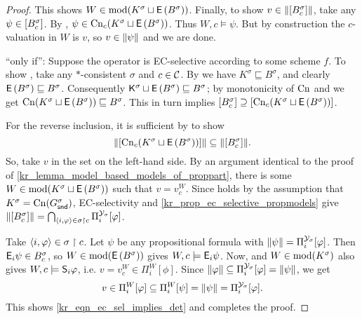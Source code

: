 \begin{proof}
    This shows $W \in \mods(K^\sigma \sqcup \exppart{B^\sigma})$. Finally, to
    show $v \in \propmods{\proppart{B^\sigma_c}}$, take any $\psi \in
    \proppart{B^\sigma_c}$. By \determination{}, $\psi \in \cn_c(K^\sigma
    \sqcup \exppart{B^\sigma})$. Thus $W, c \models \psi$. But by construction
    the $c$-valuation in $W$ is $v$, so $v \in \propmods{\psi}$ and we are
    done.

    ``only if'': Suppose the operator is EC-selective according to some scheme
    $f$. To show \determination{}, take any $\ast$-consistent $\sigma$ and $c
    \in \C$. By \containment{} we have $K^\sigma \sqsubseteq B^\sigma$, and
    clearly $\exppart{B^\sigma} \sqsubseteq B^\sigma$. Consequently $\K^\sigma
    \sqcup \exppart{B^\sigma} \sqsubseteq B^\sigma$; by monotonicity of $\cn$
    and \closure{} we get $\cn(K^\sigma \sqcup \exppart{B^\sigma}) \sqsubseteq
    B^\sigma$. This in turn implies $\proppart{B^\sigma_c} \supseteq
    \proppart{\cn_c(K^\sigma \sqcup \exppart{B^\sigma})}$.

    For the reverse inclusion, it is sufficient by \closure{} to show
    \begin{equation}
        \label{kr_eqn_ec_sel_implies_det}
        \propmods{\proppart{\cn_c(K^\sigma \sqcup \exppart{B^\sigma})}}
        \subseteq
        \propmods{\proppart{B^\sigma_c}}.
    \end{equation}
    So, take $v$ in the set on the left-hand side. By an argument identical to
    the proof of \cref{kr_lemma_model_based_models_of_proppart}, there is some
    $W \in \mods(K^\sigma \sqcup \exppart{B^\sigma})$ such that $v = v^W_c$.
    Since \soundness{} holds by the assumption that $K^\sigma =
    \cn(G^\sigma_\snd)$, EC-selectivity and
    \cref{kr_prop_ec_selective_propmodels} give
    $\propmods{\proppart{B^\sigma_c}} = \bigcap_{\tuple{i, \phi} \in \sigma \rs
    c}{ \Pi^{\Y_\sigma}_i[\phi] }$.

    Take $\tuple{i, \phi} \in \sigma \rs c$. Let $\psi$ be any propositional
    formula with $\propmods{\psi} = \Pi^{\Y_\sigma}_i[\phi]$. Then $\E_i\psi
    \in B^\sigma_c$, so $W \in \mods(\exppart{B^\sigma})$ gives $W, c \models
    \E_i\psi$. Now, \soundness{} and $W \in \mods(K^\sigma)$ also gives $W, c
    \models \S_i\phi$, i.e. $v = v^W_c \in \Pi^W_i[\phi]$. Since
    $\propmods{\phi} \subseteq \Pi^{\Y_\sigma}_i[\phi] = \propmods{\psi}$, we
    get
    \[
        v
        \in \Pi^W_i[\phi]
        \subseteq \Pi^W_i[\psi]
        = \propmods{\psi}
        = \Pi^{\Y_\sigma}_i[\phi].
    \]
    This shows \cref{kr_eqn_ec_sel_implies_det} and completes the proof.
\end{proof}

